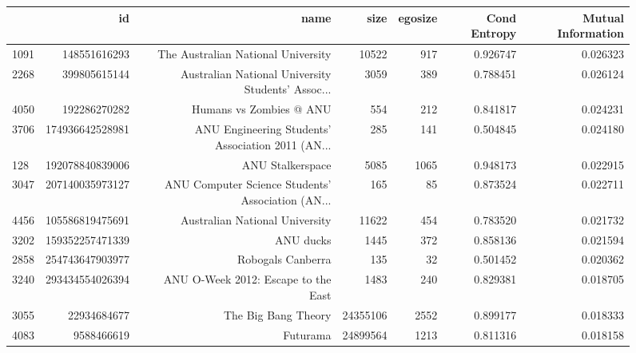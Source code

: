 \documentclass[letterpaper]{article}
\begin{document}
\begin{figure}
\cleardoublepage
\begin{table}
\begin{tabular}{| >{\small}l | >{\small}r | >{\small}r | >{\small}r | >{\small}r | >{\small}r |>{\small}r |}
\hline
{} &               id &                                               name &      size &  egosize &   Cond Entropy &  Mutual Information \\
\hline
1091 &     148551616293 &                 The Australian National University &     10522 &      917 &             0.926747 &            0.026323 \\
2268 &     399805615144 &  Australian National University Students' Assoc... &      3059 &      389 &             0.788451 &            0.026124 \\
4050 &     192286270282 &                            Humans vs Zombies @ ANU &       554 &      212 &             0.841817 &            0.024231 \\
3706 &  174936642528981 &  ANU Engineering Students' Association 2011 (AN... &       285 &      141 &             0.504845 &            0.024180 \\
128  &  192078840839006 &                                   ANU Stalkerspace &      5085 &     1065 &             0.948173 &            0.022915 \\
3047 &  207140035973127 &  ANU Computer Science Students' Association (AN... &       165 &       85 &             0.873524 &            0.022711 \\
4456 &  105586819475691 &                     Australian National University &     11622 &      454 &             0.783520 &            0.021732 \\
3202 &  159352257471339 &                                          ANU ducks &      1445 &      372 &             0.858136 &            0.021594 \\
2858 &  254743647903977 &                                  Robogals Canberra &       135 &       32 &             0.501452 &            0.020362 \\
3240 &  293434554026394 &                ANU O-Week 2012: Escape to the East &      1483 &      240 &             0.829381 &            0.018705 \\
3055 &      22934684677 &                                The Big Bang Theory &  24355106 &     2552 &             0.899177 &            0.018333 \\
4083 &       9588466619 &                                           Futurama &  24899564 &     1213 &             0.811316 &            0.018158 \\

\end{tabular}
\end{table}
\end{figure}
\end{document}
